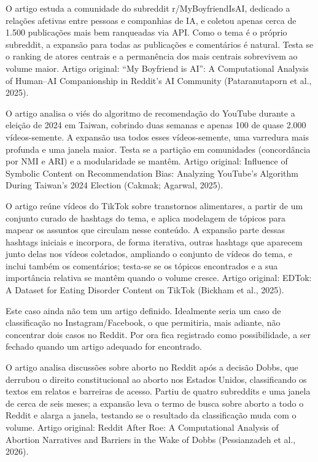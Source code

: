 \documentclass[12pt,a4paper]{article}
\begin{document}
\begin{description}[leftmargin=1.4em,style=nextline]
  \item[Centralidade --- Reddit (r/MyBoyfriendIsAI).] O artigo estuda a comunidade
  do subreddit r/MyBoyfriendIsAI, dedicado a relações afetivas entre pessoas e
  companhias de IA, e coletou apenas cerca de 1.500 publicações mais bem ranqueadas
  via API. Como o tema é o próprio subreddit, a expansão para todas as publicações e comentários é natural. Testa
  se o ranking de atores centrais e a permanência dos mais centrais sobrevivem ao
  volume maior. Artigo original: ``My Boyfriend is AI'': A Computational Analysis
  of Human--AI Companionship in Reddit's AI Community (Pataranutaporn et al., 2025).
  \item[Detecção de comunidades --- YouTube.] O artigo analisa o viés do algoritmo
  de recomendação do YouTube durante a eleição de 2024 em Taiwan, cobrindo duas
  semanas e apenas 100 de quase 2.000 vídeos-semente. A expansão usa todos esses
  vídeos-semente, uma
  varredura mais profunda e uma janela maior. Testa se a partição em comunidades
  (concordância por NMI e ARI) e a modularidade se mantêm. Artigo original:
  Influence of Symbolic Content on Recommendation Bias: Analyzing YouTube's
  Algorithm During Taiwan's 2024 Election (Cakmak; Agarwal, 2025).
  \item[Modelagem de tópico --- TikTok.] O artigo reúne vídeos do TikTok sobre
  transtornos alimentares, a partir de um conjunto curado de hashtags do tema, e
  aplica modelagem de tópicos para mapear os assuntos que circulam nesse conteúdo.
  A expansão parte dessas hashtags iniciais e incorpora, de forma iterativa, outras
  hashtags que aparecem junto delas nos vídeos coletados, ampliando o conjunto de
  vídeos do tema, e inclui também os comentários; testa-se se os tópicos encontrados
  e a sua importância relativa se mantêm quando o volume cresce. Artigo original: EDTok: A
  Dataset for Eating Disorder Content on TikTok (Bickham et al., 2025).
  \item[Classificação --- Instagram/Facebook (possibilidade).] Este caso ainda
  não tem um artigo definido. Idealmente seria um caso de classificação no
  Instagram/Facebook, o que permitiria, mais adiante, não concentrar dois casos no
  Reddit. Por ora fica registrado como possibilidade, a ser fechado quando um artigo
  adequado for encontrado.
  \item[Classificação --- Reddit.] O artigo analisa discussões sobre aborto no
  Reddit após a decisão Dobbs, que derrubou o direito constitucional ao aborto nos
  Estados Unidos, classificando os textos em relatos e barreiras de acesso. Partiu
  de quatro subreddits e uma janela de cerca de seis meses; a expansão leva o termo
  de busca sobre aborto a todo o Reddit e alarga a janela, testando se o resultado
  da classificação muda com o volume. Artigo original: Reddit
  After Roe: A Computational Analysis of Abortion Narratives and Barriers in the
  Wake of Dobbs (Pessianzadeh et al., 2026).
\end{description}
\end{document}
